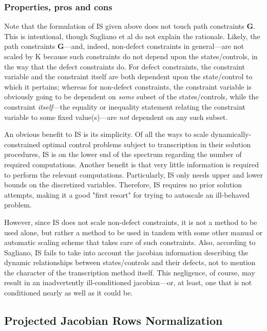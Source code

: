 \documentclass{article}
\begin{document}
\subsubsection*{Properties, pros and cons}

Note that the formulation of IS given above does not touch path constraints $\textbf{G}$. This is intentional, though Sagliano et al do not explain the rationale. Likely, the path constraints $\textbf{G}$---and, indeed, non-defect constraints in general---are not scaled by $\text{K}$ because such constraints do not depend upon the states/controls, in the way that the defect constraints do. For defect constraints, the constraint variable and the constraint itself are both dependent upon the state/control to which it pertains; whereas for non-defect constraints, the constraint variable is obviously going to be dependent on \textit{some} subset of the states/controls, while the constraint \textit{itself}---the equality or inequality statement relating the constraint variable to some fixed value(s)---are \textit{not} dependent on any such subset.

An obvious benefit to IS is its simplicity. Of all the ways to scale dynamically-constrained optimal control problems subject to transcription in their solution procedures, IS is on the lower end of the spectrum regarding the number of required computations. Another benefit is that very little information is required to perform the relevant computations. Particularly, IS only needs upper and lower bounds on the discretized variables. Therefore, IS requires no prior solution attempts, making it a good "first resort" for trying to autoscale an ill-behaved problem.

However, since IS does not scale non-defect constraints, it is not a method to be used alone, but rather a method to be used in tandem with some other manual or automatic scaling scheme that takes care of such constraints. Also, according to Sagliano, IS fails to take into account the jacobian information describing the dynamic relationships between states/controls and their defects, not to mention the character of the transcription method itself. This negligence, of course, may result in an inadvertently ill-conditioned jacobian---or, at least, one that is not conditioned nearly as well as it could be.


\subsection*{Projected Jacobian Rows Normalization}
\end{document}
